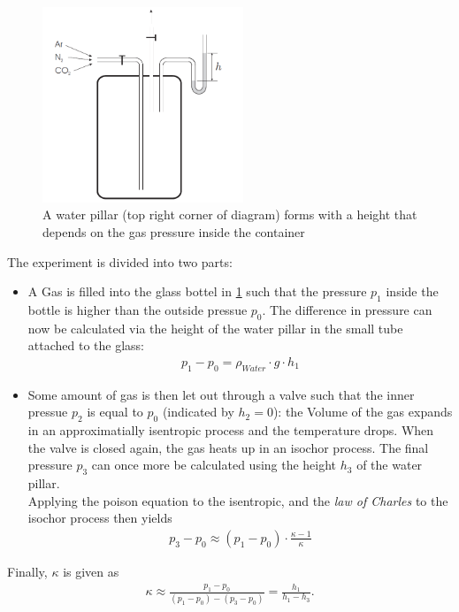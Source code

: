 \documentclass{subfiles}
\begin{document}
            \begin{figure}[H]
                \centering
                \includegraphics[width=6cm]{Bilddateien/Grundlagen/IsentropicClementDesormes.png}
                \caption{A water pillar (top right corner of diagram) forms with a height that depends on the gas pressure inside the container}
                \label{fig:ClementDesormes}
            \end{figure}

            The experiment is divided into two parts:
            \begin{itemize}
                \item A Gas is filled into the glass bottel in \ref{fig:ClementDesormes} such that the pressure $p_1$ inside the bottle is higher than the outside pressue $p_0$. The difference in pressure can now be calculated via the height of the water pillar in the small tube attached to the glass:
                \begin{align*}
                    p_1-p_0=\rho_{Water}\cdot g\cdot h_1
                \end{align*} 
                \item Some amount of gas is then let out through a valve such that the inner pressue $p_2$ is equal to $p_0$ (indicated by $h_2=0$): the Volume of the gas expands in an approximatially isentropic process and the temperature drops. When the valve is closed again, the gas heats up in an isochor process. The final pressure $p_3$ can once more be calculated using the height $h_3$ of the water pillar.\\
                
                \noindent Applying the poison equation to the isentropic, and the \textit{law of Charles} to the isochor process then yields
                \begin{align*}
                    p_3-p_0\approx(p_1-p_0)\cdot\frac{\kappa-1}{\kappa}
                \end{align*}
            \end{itemize}
            Finally, $\kappa$ is given as 
            \begin{align}
                \kappa\approx\frac{p_1-p_0}{(p_1-p_0)-(p_3-p_0)}=\frac{h_1}{h_1-h_3}.
                \label{eq:KappaCalculationClemens}
            \end{align} 


\end{document}
